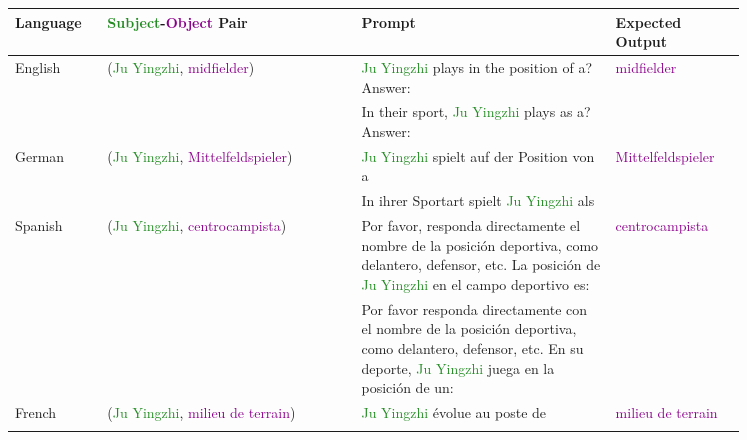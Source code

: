 \begin{table*}[htbp]
\scriptsize
\centering
\setlength{\tabcolsep}{1.0mm}{}
\begin{center}
\begin{tabular}{m{0.10\linewidth} p{0.30\linewidth} p{0.30\linewidth} m{0.15\linewidth}}
\textbf{Language} & \textbf{\textcolor{forestgreen}{Subject}-\textcolor{darkmagenta}{Object} Pair} & \textbf{Prompt} & \textbf{Expected Output} \\
\toprule
\multirow{2}{*}{\centering English} 
    & \multirow{2}{*}{\raggedright (\textcolor{forestgreen}{Ju Yingzhi}, \textcolor{darkmagenta}{midfielder})}
    & \textcolor{forestgreen}{Ju Yingzhi} plays in the position of a? \newline Answer:
    & \multirow{2}{*}{\centering \textcolor{darkmagenta}{midfielder}} \\
    & 
    & In their sport, \textcolor{forestgreen}{Ju Yingzhi} plays as a? \newline Answer:
    & \\
\midrule
\multirow{2}{*}{\centering German}
    & \multirow{2}{*}{\raggedright (\textcolor{forestgreen}{Ju Yingzhi}, \textcolor{darkmagenta}{Mittelfeldspieler})}
    & \textcolor{forestgreen}{Ju Yingzhi} spielt auf der Position von a
    & \multirow{2}{*}{\centering \textcolor{darkmagenta}{Mittelfeldspieler}} \\
    & 
    & In ihrer Sportart spielt \textcolor{forestgreen}{Ju Yingzhi} als
    & \\
\midrule
\multirow{2}{*}{\centering Spanish}
    & \multirow{2}{*}{\raggedright (\textcolor{forestgreen}{Ju Yingzhi}, \textcolor{darkmagenta}{centrocampista})}
    & Por favor, responda directamente el nombre de la posición deportiva, como delantero, defensor, etc. La posición de \textcolor{forestgreen}{Ju Yingzhi} en el campo deportivo es:
    & \multirow{2}{*}{\centering \textcolor{darkmagenta}{centrocampista}} \\
    & 
    & Por favor responda directamente con el nombre de la posición deportiva, como delantero, defensor, etc. En su deporte, \textcolor{forestgreen}{Ju Yingzhi} juega en la posición de un:
    & \\
\midrule
\multirow{2}{*}{\centering French}
    & \multirow{2}{*}{\raggedright (\textcolor{forestgreen}{Ju Yingzhi}, \textcolor{darkmagenta}{milieu de terrain})}
    & \textcolor{forestgreen}{Ju Yingzhi} évolue au poste de
    & \multirow{2}{*}{\centering \textcolor{darkmagenta}{milieu de terrain}} \\
    & 

\end{tabular}
\end{center}
\end{table*}
